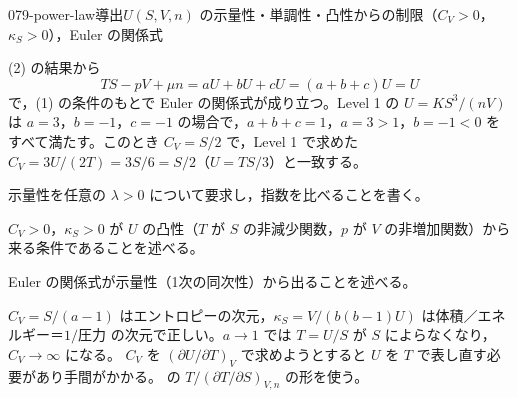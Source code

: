 \documentclass[uplatex,dvipdfmx,a4paper,11pt]{jsarticle}
\begin{document}
\begin{mondai}{079-power-law}{導出}{$U(S,V,n)$ の示量性・単調性・凸性からの制限（$C_{V}>0$，$\kappa_{S}>0$），Euler の関係式}
\begin{tadashii}
 (2) の結果から
\[ TS - pV + \mu n = aU + bU + cU = (a + b + c)U = U \]
で，(1) の条件のもとで Euler の関係式が成り立つ。Level 1 の $U = KS^{3}/(nV)$ は $a = 3$，$b = -1$，$c = -1$ の場合で，$a + b + c = 1$，$a = 3 > 1$，$b = -1 < 0$ をすべて満たす。このとき $C_{V} = S/2$ で，Level 1 で求めた $C_{V} = 3U/(2T) = 3S/6 = S/2$（$U = TS/3$）と一致する。
\begin{ronten}
  \item {} 示量性を任意の $\lambda > 0$ について要求し，指数を比べることを書く。
  \item {} $C_{V} > 0$，$\kappa_{S} > 0$ が $U$ の凸性（$T$ が $S$ の非減少関数，$p$ が $V$ の非増加関数）から来る条件であることを述べる。
  \item {} Euler の関係式が示量性（1次の同次性）から出ることを述べる。
\end{ronten}
\kenzan $C_{V} = S/(a-1)$ はエントロピーの次元，$\kappa_{S} = V/(b(b-1)U)$ は体積／エネルギー＝$1/$圧力 の次元で正しい。$a \to 1$ では $T = U/S$ が $S$ によらなくなり，$C_{V} \to \infty$ になる。
\tsumazuki $C_{V}$ を $(\partial U/\partial T)_{V}$ で求めようとすると $U$ を $T$ で表し直す必要があり手間がかかる。 の $T/(\partial T/\partial S)_{V,n}$ の形を使う。
\end{tadashii}
\end{mondai}
\end{document}
